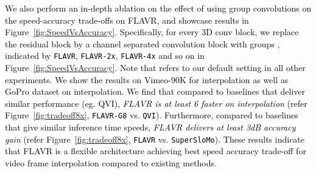 \documentclass[10pt,twocolumn,letterpaper]{article}
\newcommand{\figref}[1]{Figure~\ref{#1}}
\newcommand{\Ours}{FLAVR}
\newcommand{\twox}{}
\newcommand{\eightx}{}
\newcommand{\new}[1]{\textcolor{black}{#1}}
\begin{document}
\begin{table*}[!t]
\new{ We also perform an in-depth ablation on the effect of using group convolutions \cite{Tran19} on the speed-accuracy trade-offs on \Ours{}, and showcase results in \figref{fig:SpeedVsAccuracy}. Specifically, for every 3D conv block, we replace the residual block by a channel separated convolution block \cite{Tran19} with groups , indicated by \texttt{FLAVR}, \texttt{FLAVR-2x}, \texttt{FLAVR-4x} and so on in \figref{fig:SpeedVsAccuracy}. Note that  refers to our default setting in all other experiments. We show the results on Vimeo-90K for \twox{} interpolation as well as GoPro dataset on \eightx{} interpolation. We find that compared to baselines that deliver similar performance (eg. QVI), \emph{\Ours{} is at least 6 faster on \eightx interpolation} (refer \figref{fig:tradeoff8x}, \texttt{FLAVR-G8} vs. \texttt{QVI}). Furthermore, compared to baselines that give similar inference time speeds, \emph{\Ours{} delivers at least 3dB accuracy gain} (refer \figref{fig:tradeoff8x}, \texttt{FLAVR} vs. \texttt{SuperSloMo}). These results indicate that \Ours{} is a flexible architecture achieving best speed accuracy trade-off for video frame interpolation compared to existing methods. }


\end{table*}
\end{document}

